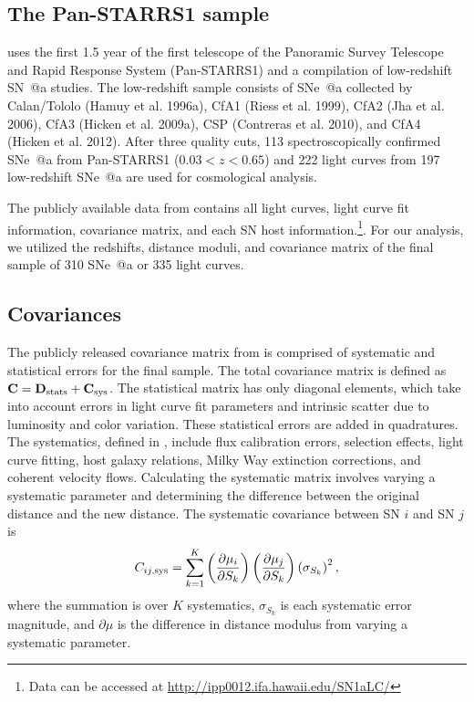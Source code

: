 \documentclass[12pt,a4paper]{article}
\makeatletter
\newcommand*{\rom}[1]{\expandafter\@slowromancap\romannumeral #1@}
\newcommand{\sn}{\mbox{SN}}
\newcommand{\sna}{\mbox{SN \rom{1}a}}
\newcommand{\snea}{\mbox{SNe \rom{1}a}}
\makeatother
\begin{document}
\subsection{The Pan-STARRS1 sample}
\label{sec:rest}
\citet{rest2014} uses the first 1.5 year of the first telescope of 
the Panoramic Survey Telescope and Rapid Response System (Pan-STARRS1) 
and a compilation of low-redshift {\sna} studies. The low-redshift 
sample consists of {\snea} collected by Calan/Tololo (Hamuy et al. 1996a), 
CfA1 (Riess et al. 1999), CfA2 (Jha et al. 2006), CfA3 (Hicken et al. 2009a), 
CSP (Contreras et al. 2010), and CfA4 (Hicken et al. 2012). After 
three quality cuts, 113 spectroscopically confirmed {\snea} from 
Pan-STARRS1 ($0.03 < z < 0.65$) and 222 light curves from 197 
low-redshift {\snea} are used for cosmological analysis. 

The publicly available data from \citet{rest2014} contains all light 
curves, light curve fit information, covariance matrix, and each {\sn} 
host information.\footnote{Data can be accessed at 
\url{http://ipp0012.ifa.hawaii.edu/SN1aLC/}}. For our analysis, we 
utilized the redshifts, distance moduli, and covariance matrix of the 
final sample of 310 {\snea} or 335 light curves.

\subsection{Covariances}
\label{sec:covariances}
The publicly released covariance matrix from \citet{rest2014} 
is comprised of systematic and statistical errors for the final sample. The total covariance matrix is defined as $\mathbf{C}= \mathbf{D}_{\textnormal{stats}}+\mathbf{C}_{\textnormal{sys}}$. The statistical matrix has only diagonal elements, which take into account errors in light curve fit parameters and intrinsic scatter due to luminosity and color variation. These statistical errors are added in quadratures. The systematics, defined in \citet{scolnic2014}, include flux calibration errors, selection effects, light curve fitting, host galaxy relations, Milky Way extinction corrections, and coherent velocity flows. Calculating the systematic matrix involves varying a systematic parameter and determining the difference between the original distance and the new distance. The systematic covariance between {\sn} $i$ and {\sn} $j$ is 
\begin{equation}
\label{eq:RestCovMatrix}
C_{ij,\textnormal{sys}}=\displaystyle \sum_{k = 1}^K \left(\frac{\partial \mu_i}{\partial S_k}\right)\left(\frac{\partial \mu_j}{\partial S_k}\right)\left(\sigma_{S_k}\right)^2,
\end{equation}
where the summation is over $K$ systematics, $\sigma_{S_k}$ is each 
systematic error magnitude, and $\partial \mu$ is the difference in 
distance modulus from varying a systematic parameter.
\end{document}

